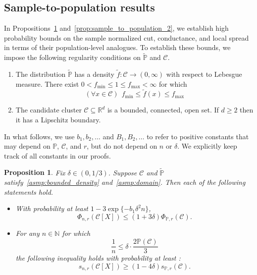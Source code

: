 \documentclass[11pt,twoside]{article}
\newtheorem{proposition}{Proposition}
\theoremstyle{definition}
\newcommand{\Reals}{\mathbb{R}}
\newcommand{\1}{\mathbf{1}}
\newcommand{\Rd}{\Reals^d}
\newcommand{\mc}[1]{\mathcal{#1}}
\newcommand{\Pbb}{\mathbb{P}}
\newcommand{\wt}[1]{\widetilde{#1}}
\begin{document}
\subsection{Sample-to-population results}
\label{subsec:sample_to_population}
In Propositions~\ref{prop:sample_to_population_1} and~\ref{prop:sample_to_population_2}, we establish high probability bounds on the sample normalized cut, conductance, and local spread in terms of their population-level analogues. To establish these bounds, we impose the following regularity conditions on $\wt{\Pbb}$ and $\mc{C}$.
\begin{enumerate}[label=(A\arabic*)]
	\item 
	\label{asmp:bounded_density} 
	The distribution $\wt{\Pbb}$ has a density $\wt{f}: \mc{C} \to (0,\infty)$ with respect to Lebesgue measure. There exist $0 < f_{\min} \leq 1 \leq f_{\max} < \infty$ for which
	\begin{equation*}
	(\forall x \in \mc{C})~~ f_{\min} \leq \wt{f}(x) \leq f_{\max}
	\end{equation*}
	\item 
	\label{asmp:domain} 
	The candidate cluster $\mc{C} \subseteq \Rd$ is a bounded, connected, open set. If $d \geq 2$ then it has a Lipschitz boundary. 
\end{enumerate}
In what follows, we use $b_1,b_2,\ldots$ and $B_1,B_2,\ldots$ to refer to positive constants that may depend on $\Pbb$, $\mc{C}$, and $r$, but do not depend on $n$ or $\delta$. We explicitly keep track of all constants in our proofs.
\begin{proposition}
	\label{prop:sample_to_population_1}
	Fix $\delta \in (0,1/3)$. Suppose $\mc{C}$ and $\wt{\Pbb}$ satisfy~\ref{asmp:bounded_density} and~\ref{asmp:domain}. Then each of the following statements hold.
	\begin{itemize}
		\item With probability at least $1 - 3\exp\{-b_1\delta^2n\}$,
		\begin{equation}
		\label{eqn:sample_to_population_normalized_cut}
		\Phi_{n,r}(\mc{C}[X]) \leq (1 + 3\delta) \Phi_{\Pbb,r}(\mc{C}).
		\end{equation}
		\item For any $n \in \mathbb{N}$ for which 
		\begin{equation}
		\label{eqn:sample_to_population_local_spread_sample_complexity}
		\frac{1}{n} \leq \delta \cdot \frac{2\Pbb(\mc{C})}{3}
		\end{equation}
		the following inequality holds with probability at least :
		\begin{equation}
		\label{eqn:sample_to_population_local_spread}
		s_{n,r}(\mc{C}[X]) \geq (1 - 4\delta) s_{\Pbb,r}(\mc{C}).
		\end{equation}
	\end{itemize}
\end{proposition}
\end{document}
